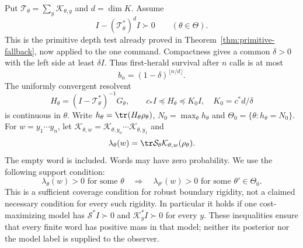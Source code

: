 Put $\mathcal T_\theta=\sum_y\mathcal K_{\theta,y}$ and $d=\dim K$. Assume
\begin{equation}\label{eq:weighted-depth}
 I-(\mathcal T_\theta^*)^dI\succ0\qquad(\theta\in\Theta).
\end{equation}
This is the primitive depth test already proved in Theorem~\ref{thm:primitive-fallback}, now applied to the one command. Compactness gives a common $\delta>0$ with the left side at least $\delta I$. Thus first-herald survival after $n$ calls is at most
\[
 b_n=(1-\delta)^{\lfloor n/d\rfloor}.
\]
The uniformly convergent resolvent
\[
 H_\theta=(I-\mathcal T_\theta^*)^{-1}G_\theta,
 \qquad c_*I\preccurlyeq H_\theta\preccurlyeq K_0I,
 \quad K_0=c^*d/\delta
\]
is continuous in $\theta$. Write $h_\theta=\tr(H_\theta\rho_\theta)$, $N_0=\max_\theta h_\theta$ and $\Theta_0=\{\theta:h_\theta=N_0\}$. For $w=y_1\cdots y_n$, let $\mathcal K_{\theta,w}=\mathcal K_{\theta,y_n}\cdots\mathcal K_{\theta,y_1}$ and
\[
 \lambda_\theta(w)=\tr\mathcal S_\theta\mathcal K_{\theta,w}(\rho_\theta).
\]
The empty word is included. Words may have zero probability. We use the following support condition:
\begin{equation}\label{eq:cost-support}
 \lambda_\theta(w)>0\text{ for some }\theta
 \quad\Longrightarrow\quad
 \lambda_{\theta'}(w)>0\text{ for some }\theta'\in\Theta_0.
\end{equation}
This is a sufficient coverage condition for robust boundary rigidity, not a claimed necessary condition for every such rigidity. In particular it holds if one cost-maximizing model has $\mathcal S^*I\succ0$ and $\mathcal K_y^*I\succ0$ for every $y$. These inequalities ensure that every finite word has positive mass in that model; neither its posterior nor the model label is supplied to the observer.

